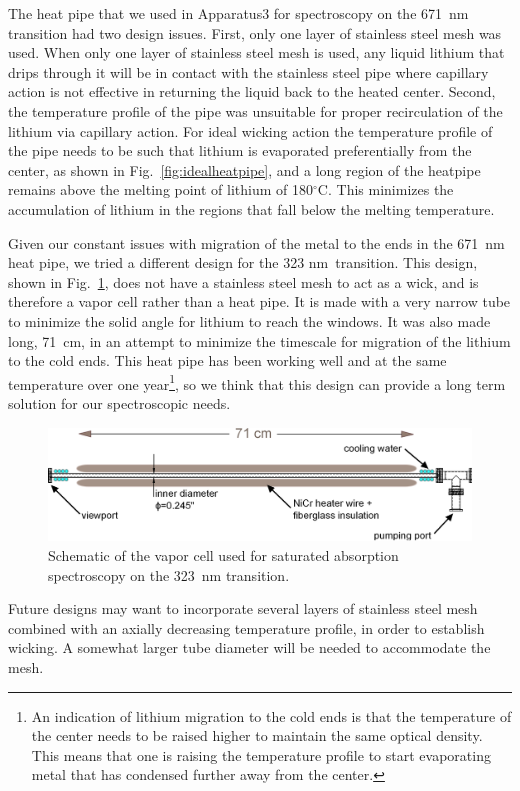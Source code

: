\documentclass[oneside,12pt]{memoir}
\begin{document}
The heat pipe that we used in Apparatus3 for spectroscopy on the 671~nm
transition had two design issues. First, only one layer of stainless steel mesh
was used. When only one layer of stainless steel mesh is used, any liquid
lithium that drips through it will be in contact with the stainless steel pipe
where capillary action is not effective in returning the liquid back to the
heated center. Second, the temperature profile of the pipe was unsuitable for
proper recirculation of the lithium via capillary action.    For ideal wicking
action the temperature profile of the pipe needs to be such that lithium is
evaporated preferentially from the center, as shown in
Fig.~\ref{fig:idealheatpipe}, and a long region of the heatpipe remains above
the melting point of lithium of 180$^{\circ}$C.  This minimizes the
accumulation of lithium in the regions that fall below the melting temperature. 


Given our constant issues with migration of the metal to the ends in the 671~nm
heat pipe, we tried a different design for the 323 nm~transition.  This design,
shown in Fig.~\ref{fig:323heatpipe}, does not have a stainless steel mesh to
act as a wick, and is therefore a vapor cell rather than a heat pipe. It is
made with a very narrow tube to minimize the solid angle for lithium to reach
the windows.   It was also made long, 71~cm, in an attempt to minimize the
timescale for migration of the lithium to the cold ends.    This heat pipe has
been working well and at the same temperature over one year\footnote{An
indication of lithium migration to the cold ends is that the temperature of the
center needs to be raised higher to maintain the same optical density.  This
means that one is raising the temperature profile to start evaporating metal
that has condensed further away from the center.}, so we think that this design
can provide a long term solution for our spectroscopic needs.  \begin{figure}
\centering
\includegraphics[width=\textwidth]{../figures/323setup/heatpipe/323heatpipe.pdf}
\caption[Vapor cell for the 323 nm transition]{\small Schematic of the vapor
cell used for saturated absorption spectroscopy on the 323~nm transition. }
\label{fig:323heatpipe} \end{figure} Future designs may want to incorporate
several layers of stainless steel mesh combined with an axially decreasing
temperature profile, in order to establish wicking.  A somewhat larger tube
diameter will be needed to accommodate the mesh. 
\end{document}
